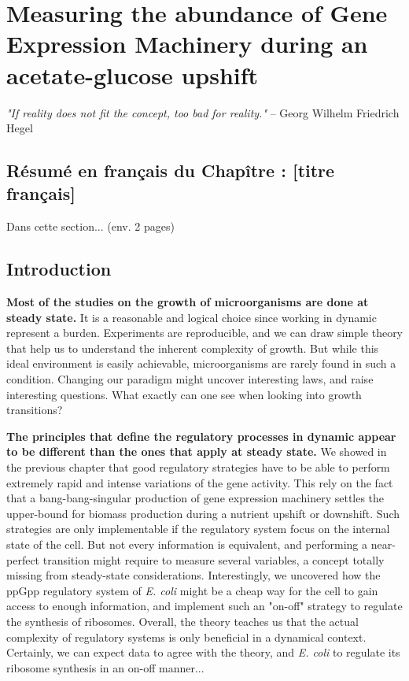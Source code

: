 \chapter{Measuring the abundance of Gene Expression Machinery during an acetate-glucose upshift}
\label{chap:experiments}

\textit{"If reality does not fit the concept, too bad for reality."} -- Georg Wilhelm Friedrich Hegel

\section*{Résumé en français du Chapître \thechapter : [titre français]}

Dans cette section... (env. 2 pages)

\section{Introduction}

\textbf{Most of the studies on the growth of microorganisms are done at steady state.}
It is a reasonable and logical choice since working in dynamic represent a burden.
Experiments are reproducible, and we can draw simple theory that help us to understand the inherent complexity of growth.
But while this ideal environment is easily achievable, microorganisms are rarely found in such a condition.
Changing our paradigm might uncover interesting laws, and raise interesting questions.
What exactly can one see when looking into growth transitions?

\textbf{The principles that define the regulatory processes in dynamic appear to be different than the ones that apply at steady state.}
We showed in the previous chapter that good regulatory strategies have to be able to perform extremely rapid and intense variations of the gene activity.
This rely on the fact that a bang-bang-singular production of gene expression machinery settles the upper-bound for biomass production during a nutrient upshift or downshift.
Such strategies are only implementable if the regulatory system focus on the internal state of the cell.
But not every information is equivalent, and performing a near-perfect transition might require to measure several variables, a concept totally missing from steady-state considerations.
Interestingly, we uncovered how the ppGpp regulatory system of \textit{E. coli} might be a cheap way for the cell to gain access to enough information, and implement such an "on-off" strategy to regulate the synthesis of ribosomes.
Overall, the theory teaches us that the actual complexity of regulatory systems is only beneficial in a dynamical context.
Certainly, we can expect data to agree with the theory, and \textit{E. coli} to regulate its ribosome synthesis in an on-off manner...

